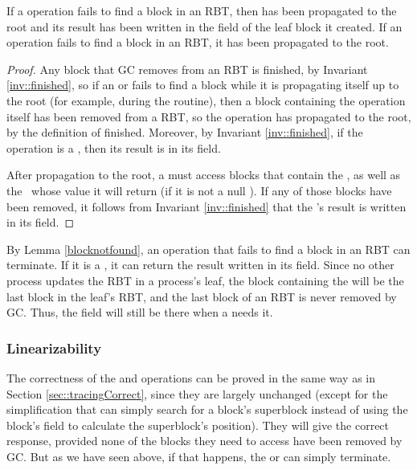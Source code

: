 \begin{lemma}\label{blocknotfound}
If a  operation fails to find a block in an RBT,
then  has been propagated to the root and its result has been written in the  field of the leaf block it created.
If an  operation fails to find a block in an RBT, it has been propagated to the root.
\end{lemma}
\begin{proof}
Any block that GC removes from an RBT is finished, by Invariant \ref{inv::finished}, so if an 
 or  fails to find a block while it is propagating itself up to
the root (for example, during the  routine), then a block containing
the operation itself has been removed from a RBT, so the operation has propagated to the root,
by the definition of finished.
Moreover, by Invariant \ref{inv::finished}, if the operation is a \dequeue, then its result is in its  field.

After propagation to the root, a  must access blocks that contain the \dequeue,
as well as the \enqueue\ whose value it will return (if it is not a null \dequeue).
If any of those blocks have been removed, it follows from Invariant \ref{inv::finished} that the
's result is written in its  field.
\end{proof}

By Lemma \ref{blocknotfound}, an operation that fails to find a block in an RBT can terminate.
If it is a , it can return the result written in its  field.
Since no other process updates the RBT in a process's leaf, the block containing the 
will be the last block in the leaf's RBT, and the last block of an RBT is never removed by GC.
Thus, the  field will still be there when a  needs it.

\subsubsection{Linearizability}

The correctness of the  and   operations
can be proved in the same way as in Section \ref{sec::tracingCorrect},
since they are largely unchanged (except for the simplification that 
can simply search for a block's superblock instead of using the block's  
field to calculate the superblock's position).
They will give the correct response, provided none of the blocks they need to access have been 
removed by GC.  But as we have seen above, if that happens, the  or  can simply terminate.

